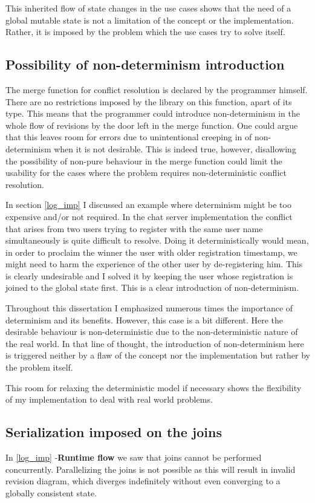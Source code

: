\documentclass[12pt,twoside,notitlepage]{report}
\begin{document}
This inherited flow of state changes in the use cases shows that the need of a global mutable state is not a limitation of the concept or the implementation. Rather, it is imposed by the problem which the use cases try to solve itself.  

\subsection{Possibility of non-determinism introduction}
\label{eval_nondet}
The merge function for conflict resolution is declared by the programmer himself. There are no restrictions imposed by the library on this function, apart of its type. This means that the programmer could introduce non-determinism in the whole flow of revisions by the door left in the merge function. One could argue that this leaves room for errors due to unintentional creeping in of non-determinism when it is not desirable. This is indeed true, however, disallowing the possibility of non-pure behaviour in the merge function could limit the usability for the cases where the problem requires non-deterministic conflict resolution.
  
In section \ref{log_imp} I discussed an example where determinism might be too expensive and/or not required. In the chat server implementation the conflict that arises from two users trying to register with the same user name simultaneously is quite difficult to resolve. Doing it deterministically would mean, in order to proclaim the winner the user with older registration timestamp,  we might need to harm the experience of the other user by de-registering him. This is clearly undesirable and I solved it by keeping the user whose registration is joined to the global state first. This is a clear introduction of non-determinism. 

Throughout this dissertation I emphasized numerous times the importance of determinism and its benefits. However, this case is a bit different. Here the desirable behaviour is non-deterministic due to the non-deterministic nature of the real world. In that line of thought, the introduction of non-determinism here is triggered neither by a flaw of the concept nor the implementation but rather by the problem itself. 

This room for relaxing the deterministic model if necessary shows the flexibility of my implementation to deal with real world problems. 

\subsection{Serialization imposed on the joins}
\label{eval_join}
In \ref{log_imp} -{\bfseries Runtime flow} we saw that joins cannot be performed concurrently. Parallelizing the joins is not possible as this will result in invalid revision diagram, which diverges indefinitely without even converging to a globally consistent state.
\end{document}
